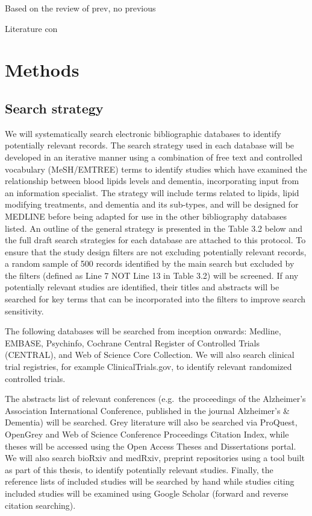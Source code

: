 \documentclass[a4paper, twoside]{templates/ociamthesis}
\begin{document}
Based on the review of prev, no previous

Literature con

\hypertarget{methods}{%
\section{Methods}\label{methods}}

\hypertarget{search-strategy}{%
\subsection{Search strategy}\label{search-strategy}}

We will systematically search electronic bibliographic databases to identify potentially relevant records. The search strategy used in each database will be developed in an iterative manner using a combination of free text and controlled vocabulary (MeSH/EMTREE) terms to identify studies which have examined the relationship between blood lipids levels and dementia, incorporating input from an information specialist. The strategy will include terms related to lipids, lipid modifying treatments, and dementia and its sub-types, and will be designed for MEDLINE before being adapted for use in the other bibliography databases listed. An outline of the general strategy is presented in the Table 3.2 below and the full draft search strategies for each database are attached to this protocol. To ensure that the study design filters are not excluding potentially relevant records, a random sample of 500 records identified by the main search but excluded by the filters (defined as Line 7 NOT Line 13 in Table 3.2) will be screened. If any potentially relevant studies are identified, their titles and abstracts will be searched for key terms that can be incorporated into the filters to improve search sensitivity.

The following databases will be searched from inception onwards: Medline, EMBASE, Psychinfo, Cochrane Central Register of Controlled Trials (CENTRAL), and Web of Science Core Collection. We will also search clinical trial registries, for example ClinicalTrials.gov, to identify relevant randomized controlled trials.

The abstracts list of relevant conferences (e.g.~the proceedings of the Alzheimer's Association International Conference, published in the journal Alzheimer's \& Dementia) will be searched. Grey literature will also be searched via ProQuest, OpenGrey and Web of Science Conference Proceedings Citation Index, while theses will be accessed using the Open Access Theses and Dissertations portal. We will also search bioRxiv and medRxiv, preprint repositories using a tool built as part of this thesis, to identify potentially relevant studies. Finally, the reference lists of included studies will be searched by hand while studies citing included studies will be examined using Google Scholar (forward and reverse citation searching).
\end{document}
